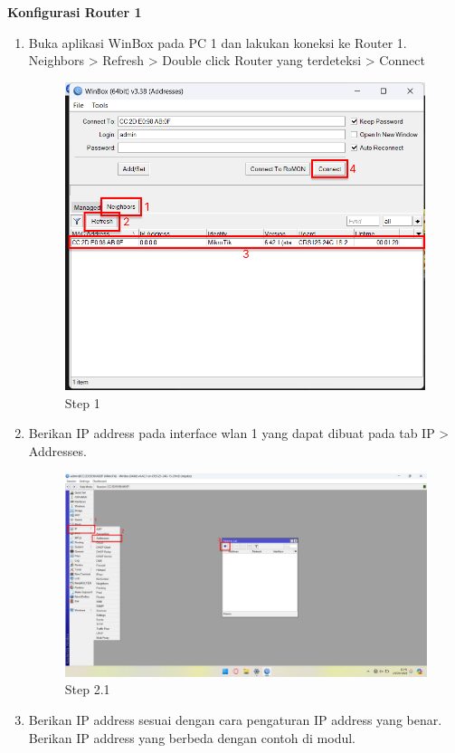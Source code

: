 \begin{center}
	\textbf{Konfigurasi Router 1}
	\begin{enumerate}
		\item Buka aplikasi WinBox pada PC 1 dan lakukan koneksi ke Router 1.\\Neighbors > Refresh > Double click Router yang terdeteksi > Connect
		\begin{figure}[H]
			\centering
			\includegraphics[width=0.8\linewidth]{P1/img/per1/pc1/Step 1.png}
			\caption{Step 1}
			\label{fig:Step 1(Per.1 PC1)}
		\end{figure}
		\item Berikan IP address pada interface wlan 1 yang dapat dibuat pada tab IP > Addresses.
		\begin{figure}[H]
			\centering
			\includegraphics[width=0.9\linewidth]{P1/img/per1/pc1/Step 2.1.png}
			\caption{Step 2.1}
			\label{fig:Step 2.1(Per.1 PC1)}
		\end{figure}
		\item Berikan IP address sesuai dengan cara pengaturan IP address yang benar. Berikan IP address yang berbeda dengan contoh di modul.

\end{enumerate}
\end{center}

